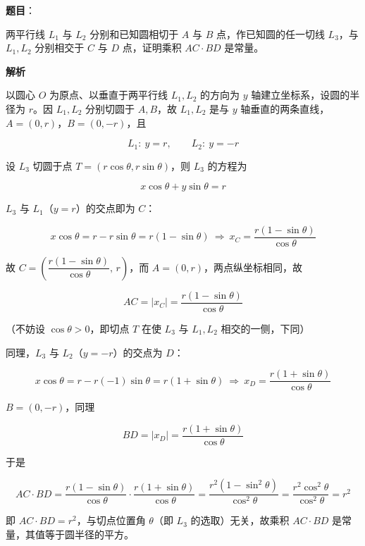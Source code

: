 \begin{answer}

\textbf{题目}：

两平行线 $L_1$ 与 $L_2$ 分别和已知圆相切于 $A$ 与 $B$ 点，作已知圆的任一切线 $L_3$，与 $L_1,L_2$ 分别相交于 $C$ 与 $D$ 点，证明乘积 $AC\cdot BD$ 是常量。
\nopagebreak[4]
\begin{center}\end{center}
\nopagebreak[4]
\textbf{解析}

以圆心 $O$ 为原点、以垂直于两平行线 $L_1,L_2$ 的方向为 $y$ 轴建立坐标系，设圆的半径为 $r$。因 $L_1,L_2$ 分别切圆于 $A,B$，故 $L_1,L_2$ 是与 $y$ 轴垂直的两条直线，$A=(0,r)$，$B=(0,-r)$，且

\nopagebreak[4]
\[
L_1:\ y=r,\qquad L_2:\ y=-r
\]

设 $L_3$ 切圆于点 $T=(r\cos\theta,r\sin\theta)$，则 $L_3$ 的方程为

\nopagebreak[4]
\[
x\cos\theta+y\sin\theta=r
\]

$L_3$ 与 $L_1$（$y=r$）的交点即为 $C$：

\nopagebreak[4]
\[
x\cos\theta=r-r\sin\theta=r(1-\sin\theta)\ \Longrightarrow\ x_C=\frac{r(1-\sin\theta)}{\cos\theta}
\]

故 $C=\left(\dfrac{r(1-\sin\theta)}{\cos\theta},\,r\right)$，而 $A=(0,r)$，两点纵坐标相同，故

\nopagebreak[4]
\[
AC=|x_C|=\frac{r(1-\sin\theta)}{\cos\theta}
\]

（不妨设 $\cos\theta>0$，即切点 $T$ 在使 $L_3$ 与 $L_1,L_2$ 相交的一侧，下同）

同理，$L_3$ 与 $L_2$（$y=-r$）的交点为 $D$：

\nopagebreak[4]
\[
x\cos\theta=r-r(-1)\sin\theta=r(1+\sin\theta)\ \Longrightarrow\ x_D=\frac{r(1+\sin\theta)}{\cos\theta}
\]

$B=(0,-r)$，同理

\nopagebreak[4]
\[
BD=|x_D|=\frac{r(1+\sin\theta)}{\cos\theta}
\]

于是

\nopagebreak[4]
\[
AC\cdot BD=\frac{r(1-\sin\theta)}{\cos\theta}\cdot\frac{r(1+\sin\theta)}{\cos\theta}
=\frac{r^2(1-\sin^2\theta)}{\cos^2\theta}=\frac{r^2\cos^2\theta}{\cos^2\theta}=r^2
\]

即 $AC\cdot BD=r^2$，与切点位置角 $\theta$（即 $L_3$ 的选取）无关，故乘积 $AC\cdot BD$ 是常量，其值等于圆半径的平方。


\end{answer}

